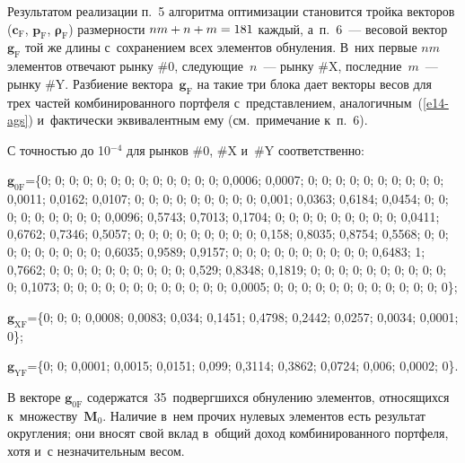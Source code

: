 \begin{multicols}{2}
  Результатом реализации п.~5 алгоритма оптимизации становится тройка 
векторов ($\boldsymbol{c}_{\mathrm{F}}$, $\boldsymbol{p}_{\mathrm{F}}$, 
$\boldsymbol{\rho}_{\mathrm{F}}$) размерности $nm \hm+ n \hm+ m \hm= 181$ 
каждый, а~п.~6~--- весовой вектор~$\boldsymbol{g}_{\mathrm{F}}$ той же 
длины с~сохранением всех элементов обнуления. В~них первые $nm$ 
элементов отвечают рынку \#0, следующие~$n$~--- рынку \#X, 
последние~$m$~--- рынку \#Y. Разбиение 
вектора~$\boldsymbol{g}_{\mathrm{F}}$ на такие три блока дает векторы весов 
для трех час\-тей комбинированного портфеля с~представлением,  
аналогичным~(\ref{e14-ags}) и~фактически эквивалентным ему (см.\ 
примечание к~п.~6). 
  
  
  С точностью до 10$^{-4}$ для рынков \#0, \#X и~\#Y соответственно: 
  
  \vspace*{3pt}
  
 \noindent
  $\boldsymbol{g}_{\mathrm{0F}}$\;=\;\{0; 0; 0; 0; 0; 0; 0; 0; 0; 0; 0; 0; 0; 0,0006; 0,0007; 0; 
0; 0; 0; 0; 0; 0; 0; 0; 0; 0,0011; 0,0162; 0,0107; 0; 0; 0; 0; 0; 0; 0; 0; 0; 0,001; 0,0363; 0,6184; 
0,0454; 0; 0; 0; 0; 0; 0; 0; 0; 0; 0,0096; 0,5743; 0,7013; 0,1704; 0; 0; 0; 0; 0; 0; 0; 0; 0; 0,0411; 
0,6762; 0,7346; 0,5057; 0; 0; 0; 0; 0; 0; 0; 0; 0; 0,158; 0,8035; 0,8754; 0,5568; 0; 0; 0; 0; 0; 0; 0; 0; 
0; 0,6035; 0,9589; 0,9157; 0; 0; 0; 0; 0; 0; 0; 0; 0; 0; 0,6483; 1; 0,7662; 0; 0; 0; 0; 0; 0; 0; 0; 0; 0; 
0,529; 0,8348; 0,1819; 0; 0; 0; 0; 0; 0; 0; 0; 0; 0; 0; 0,1073; 0; 0; 0; 0; 0; 0; 0; 0; 0; 0; 0; 0; 0,0005; 
0; 0; 0; 0; 0; 0; 0; 0; 0; 0; 0; 0; 0\}; 

  \vspace*{3pt}
  
\noindent
  $\boldsymbol{g}_{\mathrm{XF}}$\;=\;\{0; 0; 0; 0,0008; 0,0083; 0,034; 0,1451; 0,4798; 
0,2442; 0,0257; 0,0034; 0,0001; 0\}; 
  
    \vspace*{3pt}
    
\noindent
  $\boldsymbol{g}_{\mathrm{YF}}$\;=\;\{0; 0; 0,0001; 0,0015; 0,0151; 0,099; 0,3114; 
0,3862; 0,0724; 0,006; 0,0002; 0\}. 

  \vspace*{3pt}
  
  В векторе $\boldsymbol{g}_{0\mathrm{F}}$ содержатся~35~подвергшихся 
обнулению элементов, относящихся к~множеству~$\mathbf{M}_0$. Наличие в~нем 
прочих нулевых элементов есть результат округления; они вносят свой вклад 
в~общий доход комбинированного портфеля, хотя и~с незначительным весом. 
  

\end{multicols}
